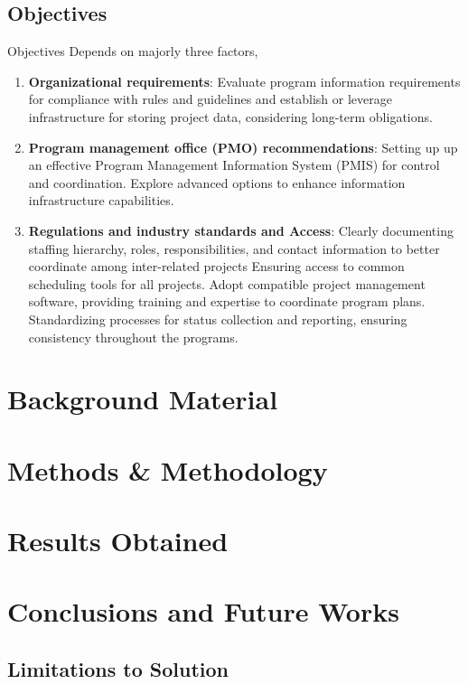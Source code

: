 \documentclass[runningheads]{llncs}
\begin{document}
\subsection{Objectives}
Objectives Depends on majorly three factors,
\begin{enumerate}

\item \textbf{Organizational requirements}:
\subitem Evaluate program information requirements for compliance with rules and guidelines and establish or leverage infrastructure for storing project data, considering long-term obligations.
\item \textbf{Program management office (PMO) recommendations}:
\subitem Setting up up an effective Program Management Information System (PMIS) for control and coordination.
\subitem Explore advanced options to enhance information infrastructure capabilities.
\item \textbf{Regulations and industry standards and Access}:
\subitem Clearly documenting staffing hierarchy, roles, responsibilities, and contact information to better coordinate among inter-related projects
\subitem Ensuring access to common scheduling tools for all projects.
\subitem Adopt compatible project management software, providing training and expertise to coordinate program plans.
\subitem Standardizing processes for status collection and reporting, ensuring consistency throughout the programs.

\end{enumerate}

\section{Background Material}

\section{Methods \& Methodology}

\section{Results Obtained}

\section{Conclusions and Future Works}

\subsection{Limitations to Solution}
\end{document}

